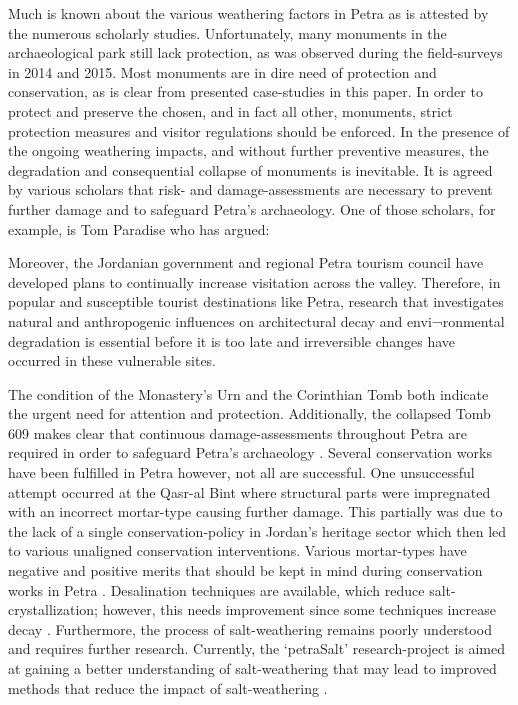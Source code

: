 Much is known about the various weathering factors in Petra as is attested by the numerous scholarly studies.
Unfortunately, many monuments in the archaeological park still lack protection, as was observed during the field-surveys in 2014 and 2015.
Most monuments are in dire need of protection and conservation, as is clear from presented case-studies in this paper.
In order to protect and preserve the chosen, and in fact all other, monuments, strict protection measures and
visitor regulations should be enforced.
In the presence of the ongoing weathering impacts, and without further preventive measures, the degradation and
consequential collapse of monuments is inevitable.
It is agreed by various scholars that risk- and damage-assessments are necessary to prevent further damage and
to safeguard Petra’s archaeology. One of those scholars, for example, is Tom Paradise who has argued:
\begin{IJSRAquote}{\cite[75]{paradise2010}}
		Moreover, the Jordanian government and regional Petra tourism council have developed plans to continually increase visitation across the valley. Therefore, in popular and susceptible tourist destinations like Petra, research that investigates natural and anthropogenic influences on architectural decay and envi¬ronmental degradation is essential before it is too late and irreversible changes have occurred in these vulnerable sites.
\end{IJSRAquote}

The condition of the Monastery’s Urn and the Corinthian Tomb both indicate the urgent need for attention and protection.
Additionally, the collapsed Tomb 609 makes clear that continuous damage-assessments throughout Petra are
required in order to safeguard Petra’s archaeology \parencite[672]{heinrichs2008}.
Several conservation works have been fulfilled in Petra however, not all are successful.
One unsuccessful attempt occurred at the Qasr-al Bint where structural parts were impregnated with
an incorrect mortar-type causing further damage.
This partially was due to the lack of a single conservation-policy in Jordan’s heritage sector which then led to
various unaligned conservation interventions.
Various mortar-types have negative and positive merits that should be kept in mind during
conservation works in Petra \parencite[926--932]{alsaad2001}.
Desalination techniques are available, which reduce salt-crystallization; however,
this needs improvement since some techniques increase decay \parencites[561--563]{matyscak2014}[1915--1916]{rörigdalgaard2015}[1125--1129]{young2003}.
Furthermore, the process of salt-weathering remains poorly understood and requires further research.
Currently, the ‘petraSalt’ research-project is aimed at gaining a better understanding of salt-weathering that may lead to
improved methods that reduce the impact of salt-weathering \parencite[347--348]{heinrichs2013a}.

